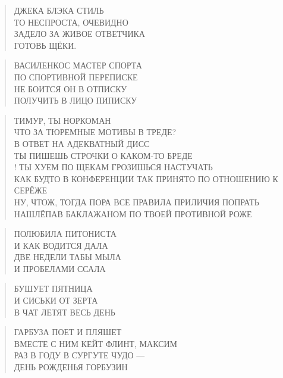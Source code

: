 \poemtitle{***}
\begin{verse}
ДЖЕКА БЛЭКА СТИЛЬ\\
ТО НЕСПРОСТА, ОЧЕВИДНО\\
ЗАДЕЛО ЗА ЖИВОЕ ОТВЕТЧИКА\\
ГОТОВЬ ЩЁКИ.
\end{verse}

\poemtitle{***}
\begin{verse}
ВАСИЛЕНКОС МАСТЕР СПОРТА\\
ПО СПОРТИВНОЙ ПЕРЕПИСКЕ\\
НЕ БОИТСЯ ОН В ОТПИСКУ\\
ПОЛУЧИТЬ В ЛИЦО ПИПИСКУ
\end{verse}

\poemtitle{***}
\begin{verse}
ТИМУР, ТЫ НОРКОМАН\\
ЧТО ЗА ТЮРЕМНЫЕ МОТИВЫ В ТРЕДЕ?\\
В ОТВЕТ НА АДЕКВАТНЫЙ ДИСС\\
ТЫ ПИШЕШЬ СТРОЧКИ О КАКОМ-ТО  БРЕДЕ\\!
ТЫ ХУЕМ ПО ЩЕКАМ ГРОЗИШЬСЯ НАСТУЧАТЬ\\
КАК БУДТО В КОНФЕРЕНЦИИ ТАК ПРИНЯТО ПО ОТНОШЕНИЮ К СЕРЁЖЕ\\
НУ, ЧТОЖ, ТОГДА ПОРА ВСЕ ПРАВИЛА ПРИЛИЧИЯ ПОПРАТЬ\\
НАШЛЁПАВ БАКЛАЖАНОМ ПО ТВОЕЙ ПРОТИВНОЙ РОЖЕ
\end{verse}

\poemtitle{***}
\begin{verse}
ПОЛЮБИЛА ПИТОНИСТА\\
И КАК ВОДИТСЯ ДАЛА\\
ДВЕ НЕДЕЛИ ТАБЫ МЫЛА\\
И ПРОБЕЛАМИ ССАЛА
\end{verse}

\poemtitle{***}
\begin{verse}
БУШУЕТ ПЯТНИЦА\\
И СИСЬКИ ОТ ЗЕРТА\\
В ЧАТ ЛЕТЯТ ВЕСЬ ДЕНЬ
\end{verse}

\poemtitle{***}
\begin{verse}
ГАРБУЗА ПОЕТ И ПЛЯШЕТ\\
ВМЕСТЕ С НИМ КЕЙТ ФЛИНТ, МАКСИМ\\
РАЗ В ГОДУ В СУРГУТЕ ЧУДО —\\
ДЕНЬ РОЖДЕНЬЯ ГОРБУЗИН
\end{verse}

